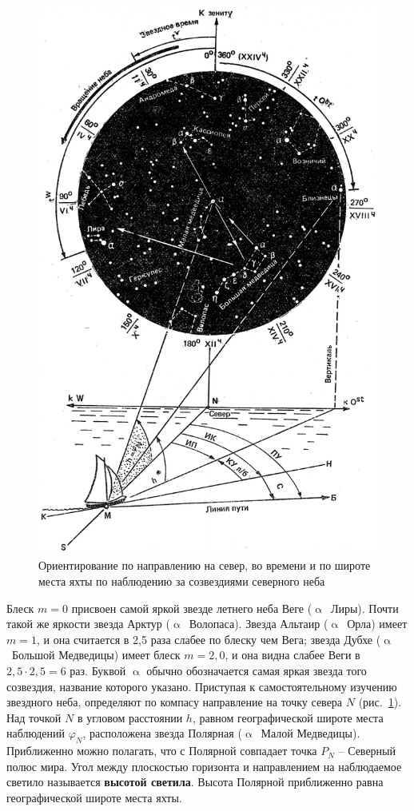 \documentclass[a4paper, 12pt, twoside, final, book, russian, fittopage, cyremdash]{ncc}
\newcommand{\ris}[1]{\ref{fig:#1}}
\begin{document}
\begin{figure}[htb]
  \centering{}
  \includegraphics[scale=1]{0087P}
  \caption{Ориентирование по направлению на север, во времени и по широте места яхты по наблюдению за созвездиями северного неба}
  \label{fig:87}
\end{figure}

Блеск $m = 0$ присвоен самой яркой звезде летнего неба Веге ($\upalpha$~Лиры). Почти такой же яркости звезда Арктур ($\upalpha$~Волопаса). Звезда Альтаир ($\upalpha$~Орла) имеет $m = 1$, и она считается в 2,5 раза слабее по блеску чем Вега; звезда Дубхе ($\upalpha$~Большой Медведицы) имеет блеск $m = 2,0$, и она видна слабее Веги в $2,5 \cdot 2,5 = 6$ раз. Буквой $\upalpha$ обычно обозначается самая яркая звезда того созвездия, название которого указано. Приступая к самостоятельному изучению звездного неба, определяют по компасу направление на точку севера $N$ (рис.~\ris{87}). Над точкой $N$ в угловом расстоянии $h$, равном географической широте места наблюдений $\varphi_N$, расположена звезда Полярная ($\upalpha$~Малой Медведицы). Приближенно можно полагать, что с Полярной совпадает точка $P_N$ \--- Северный полюс мира. Угол между плоскостью горизонта и направлением на наблюдаемое светило называется \textbf{высотой светила}. Высота Полярной приближенно равна географической широте места яхты.
\end{document}
